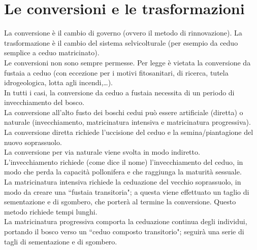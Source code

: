 \documentclass{article}
\begin{document}
\section{Le conversioni e le trasformazioni}
La conversione è il cambio di governo (ovvero il metodo di rinnovazione). La trasformazione è il cambio del sistema selvicolturale (per esempio da ceduo semplice a ceduo matricinato).\\
Le conversioni non sono sempre permesse. Per legge è vietata la conversione da fustaia a ceduo (con eccezione per i motivi fitosanitari, di ricerca, tutela idrogeologica, lotta agli incendi,\dots).\\
In tutti i casi, la conversione da ceduo a fustaia necessita di un periodo di invecchiamento del bosco.\\
La conversione all'alto fusto dei boschi cedui può essere artificiale (diretta) o naturale (invecchiamento, matricinatura intensiva e matricinatura progressiva).\\
La conversione diretta richiede l'uccisione del ceduo e la semina/piantagione del nuovo soprassuolo.\\
La conversione per via naturale viene svolta in modo indiretto.\\
L'invecchiamento richiede (come dice il nome) l'invecchiamento del ceduo, in modo che perda la capacità pollonifera e che raggiunga la maturità sessuale.\\
La matricinatura intensiva richiede la ceduazione del vecchio soprassuolo, in modo da creare una ``fustaia transitoria"; a questa viene effettuato un taglio di sementazione e di sgombero, che porterà al termine la conversione. Questo metodo richiede tempi lunghi.\\
La matricinatura progressiva comporta la ceduazione continua degli individui, portando il bosco verso un ``ceduo composto transitorio"; seguirà una serie di tagli di sementazione e di sgombero. 
\end{document}
